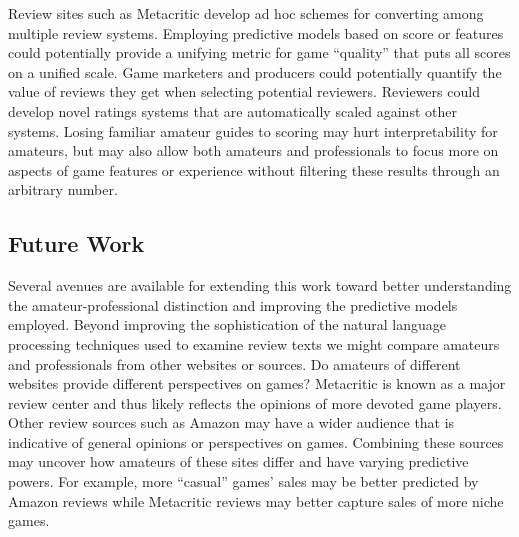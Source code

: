 \documentclass[letterpaper]{article}
\begin{document}
Review sites such as Metacritic develop ad hoc schemes for converting among multiple review systems. Employing predictive models based on score or features could potentially provide a unifying metric for game ``quality'' that puts all scores on a unified scale. Game marketers and producers could potentially quantify the value of reviews they get when selecting potential reviewers. Reviewers could develop novel ratings systems that are automatically scaled against other systems. Losing familiar amateur guides to scoring may hurt interpretability for amateurs, but may also allow both amateurs and professionals to focus more on aspects of game features or experience without filtering these results through an arbitrary number.


\subsection{Future Work}

Several avenues are available for extending this work toward better understanding the amateur-professional distinction and improving the predictive models employed. Beyond improving the sophistication of the natural language processing techniques used to examine review texts we might compare amateurs and professionals from other websites or sources. Do amateurs of different websites provide different perspectives on games? Metacritic is known as a major review center and thus likely reflects the opinions of more devoted game players. Other review sources such as Amazon may have a wider audience that is indicative of general opinions or perspectives on games. Combining these sources may uncover how amateurs of these sites differ and have varying predictive powers. For example, more ``casual'' games' sales may be better predicted by Amazon reviews while Metacritic reviews may better capture sales of more niche games.

\end{document}
